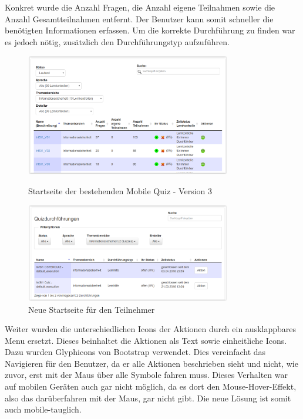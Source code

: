 Konkret wurde die Anzahl Fragen, die Anzahl eigene Teilnahmen sowie die Anzahl Gesamtteilnahmen entfernt. Der Benutzer kann somit schneller die benötigten Informationen erfassen. Um die korrekte Durchführung zu finden war es jedoch nötig, zusätzlich den Durchführungstyp aufzuführen. 


\begin{figure}[H]
	\centering
	\includegraphics[width=0.8\textwidth]{Images/Startseite_alt.PNG}
	\caption{Startseite der bestehenden Mobile Quiz - Version 3}
	\cite{mobilequiz.ch}
\end{figure}


\begin{figure}[H]
	\centering
	\includegraphics[width=0.8\textwidth]{Images/Startseite_neu.PNG}
	\caption{Neue Startseite für den Teilnehmer}
\end{figure}


Weiter wurden die unterschiedlichen Icons der Aktionen durch ein ausklappbares Menu ersetzt. Dieses beinhaltet die Aktionen als Text sowie einheitliche Icons. Dazu wurden Glyphicons von Bootstrap \cite{glyphicons} verwendet. Dies vereinfacht das Navigieren für den Benutzer, da er alle Aktionen beschrieben sieht und nicht, wie zuvor, erst mit der Maus über alle Symbole fahren muss. Dieses Verhalten war auf mobilen Geräten auch gar nicht möglich, da es dort den \glqq Mouse-Hover-Effekt\grqq, also das darüberfahren mit der Maus, gar nicht gibt. Die neue Lösung ist somit auch mobile-tauglich.

